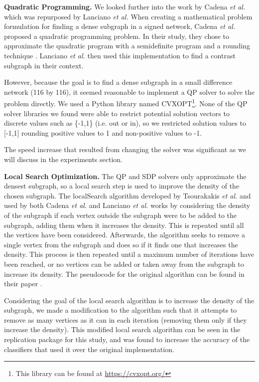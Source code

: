 \documentclass[sigconf]{acmart}
\begin{document}
\textbf{Quadratic Programming.}
We looked further into the work by Cadena \emph{et al.} which was repurposed by Lanciano \emph{et al.}
When creating a mathematical problem formulation for finding a dense subgraph in a signed network, Cadena \emph{et al.} proposed a quadratic programming problem.
In their study, they chose to approximate the quadratic program with a semidefinite program and a rounding technique \cite{cadena2016}.
Lanciano \emph{et al.} then used this implementation to find a contrast subgraph in their context.

However, because the goal is to find a dense subgraph in a small difference network (116 by 116), it seemed reasonable to implement a QP solver to solve the problem directly.
We used a Python library named CVXOPT\footnote{This library can be found at \url{https://cvxopt.org/}}.
None of the QP solver libraries we found were able to restrict potential solution vectors to discrete values such as \{-1,1\} (i.e. out or in), so we restricted solution values to [-1,1] rounding positive values to 1 and non-positive values to -1.

The speed increase that resulted from changing the solver was significant as we will discuss in the experiments section.

\textbf{Local Search Optimization.}
The QP and SDP solvers only approximate the densest subgraph, so a local search step is used to improve the density of the chosen subgraph.
The localSearch algorithm developed by Tsourakakis \emph{et al.} and used by both Cadena \emph{et al.} and Lanciano \emph{et al.} works by considering the density of the subgraph if each vertex outside the subgraph were to be added to the subgraph, adding them when it increases the density.
This is repeated until all the vertices have been considered.
Afterwards, the algorithm seeks to remove a single vertex from the subgraph and does so if it finds one that increases the density.
This process is then repeated until a maximum number of iterations have been reached, or no vertices can be added or taken away from the subgraph to increase its density.
The pseudocode for the original algorithm can be found in their paper \cite{tsourakakis2013}.

Considering the goal of the local search algorithm is to increase the density of the subgraph, we made a modification to the algorithm such that it attempts to remove as many vertices as it can in each iteration (removing them only if they increase the density).
This modified local search algorithm can be seen in the replication package for this study, and was found to increase the accuracy of the classifiers that used it over the original implementation.
\end{document}
